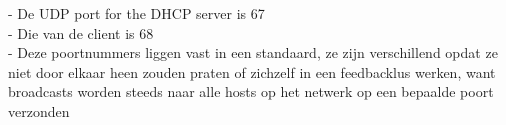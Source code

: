 - De UDP port for the DHCP server is 67\\
- Die van de client is 68\\
- Deze poortnummers liggen vast in een standaard, ze zijn verschillend opdat ze niet door elkaar heen zouden praten of zichzelf in een feedbacklus werken, want broadcasts worden steeds naar alle hosts op het netwerk op een bepaalde poort verzonden